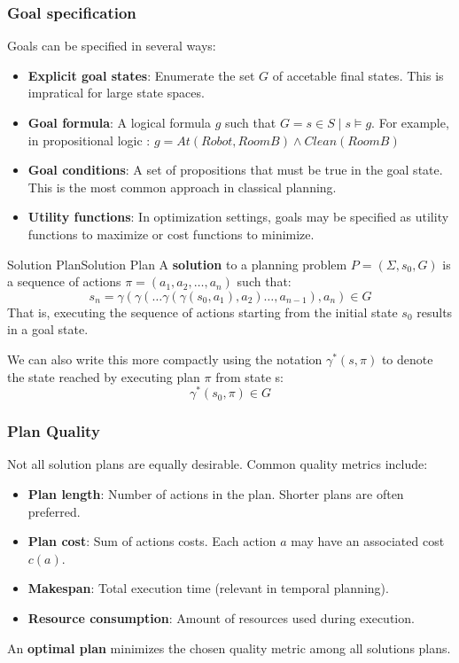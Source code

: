 \documentclass[a4paper]{article}
\theoremstyle{definition}
\begin{document}
\subsubsection{Goal specification}
Goals can be specified in several ways:
\begin{itemize}
    \item \textbf{Explicit goal states}: Enumerate the set \( G \) of accetable final states.
        This is impratical for large state spaces.
    \item \textbf{Goal formula}: A logical formula \( g \) such that 
        \( G = {s \in S \;|\; s \models g}\). For example, in propositional 
        logic : \( g = At(Robot,RoomB)\wedge Clean(RoomB) \)
    \item \textbf{Goal conditions}: A set of propositions that must be true in the goal state.
        This is the most common approach in classical planning.
    \item \textbf{Utility functions}: In optimization settings, goals may be specified as utility 
        functions to maximize or cost functions to minimize.
\end{itemize}
\begin{definition}{Solution Plan}{Solution Plan}
A \textbf{solution} to a planning problem \( P = (\Sigma,s_0,G) \) is a 
sequence of actions \( \pi = (a_1,a_2,\ldots,a_n) \) such that:
\[
  s_n = \gamma(\gamma(\ldots \gamma(\gamma(s_0,a_1),a_2)\ldots, a_{n-1}),a_n)\in G
\]
That is, executing the sequence of actions starting from the initial state \( s_0 \) results in a goal state.
\end{definition}
We can also write this more compactly using the notation \( \gamma^*(s,\pi) \) to denote
the state reached by executing plan \( \pi \) from state s:
\[
  \gamma^*(s_0,\pi) \in G
\]
\subsubsection{Plan Quality}
Not all solution plans are equally desirable. Common quality metrics include:
\begin{itemize}
    \item \textbf{Plan length}: Number of actions in the plan. Shorter plans are often preferred.
    \item \textbf{Plan cost}: Sum of actions costs. Each action \( a \) may have an associated cost \( c(a) \).
    \item \textbf{Makespan}: Total execution time (relevant in temporal planning).
    \item \textbf{Resource consumption}: Amount of resources used during execution.
\end{itemize}
An \textbf{optimal plan} minimizes the chosen quality metric among all solutions plans.
\end{document}
